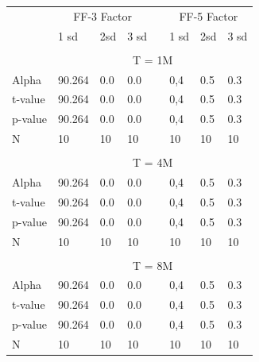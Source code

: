 \begin{table}[]
\begin{tabular}{llllllll}
\hline \hline
\textbf{} & \multicolumn{3}{c}{FF-3 Factor} &  & \multicolumn{3}{c}{FF-5 Factor} \\ \cline{2-4} \cline{6-8} 
          & 1 sd       & 2sd     & 3 sd     &  & 1 sd      & 2sd      & 3 sd     \\ \cline{2-4} \cline{6-8} 
          &            &         &          &  &           &          &          \\
          & \multicolumn{7}{c}{T = 1M}                                           \\ \hline
Alpha     & 90.264     & 0.0     & 0.0      &  & 0,4       & 0.5      & 0.3      \\
t-value   & 90.264     & 0.0     & 0.0      &  & 0,4       & 0.5      & 0.3      \\
p-value   & 90.264     & 0.0     & 0.0      &  & 0,4       & 0.5      & 0.3      \\
N         & 10         & 10      & 10       &  & 10        & 10       & 10       \\ \hline
          &            &         &          &  &           &          &          \\
          & \multicolumn{7}{c}{T = 4M}                                           \\ \hline
Alpha     & 90.264     & 0.0     & 0.0      &  & 0,4       & 0.5      & 0.3      \\
t-value   & 90.264     & 0.0     & 0.0      &  & 0,4       & 0.5      & 0.3      \\
p-value   & 90.264     & 0.0     & 0.0      &  & 0,4       & 0.5      & 0.3      \\
N         & 10         & 10      & 10       &  & 10        & 10       & 10       \\
          &            &         &          &  &           &          &          \\
          & \multicolumn{7}{c}{T = 8M}                                           \\ \hline
Alpha     & 90.264     & 0.0     & 0.0      &  & 0,4       & 0.5      & 0.3      \\
t-value   & 90.264     & 0.0     & 0.0      &  & 0,4       & 0.5      & 0.3      \\
p-value   & 90.264     & 0.0     & 0.0      &  & 0,4       & 0.5      & 0.3      \\
N         & 10         & 10      & 10       &  & 10        & 10       & 10       \\

\end{tabular}
\end{table}
